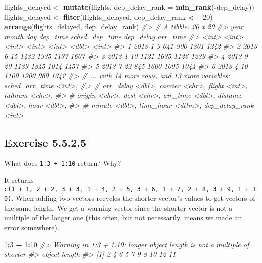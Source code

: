 \documentclass[]{book}
\newenvironment{Shaded}{\begin{snugshade}}{\end{snugshade}}
\newcommand{\CommentTok}[1]{\textcolor[rgb]{0.56,0.35,0.01}{\textit{#1}}}
\newcommand{\DataTypeTok}[1]{\textcolor[rgb]{0.13,0.29,0.53}{#1}}
\newcommand{\DecValTok}[1]{\textcolor[rgb]{0.00,0.00,0.81}{#1}}
\newcommand{\KeywordTok}[1]{\textcolor[rgb]{0.13,0.29,0.53}{\textbf{#1}}}
\newcommand{\NormalTok}[1]{#1}
\newcommand{\OperatorTok}[1]{\textcolor[rgb]{0.81,0.36,0.00}{\textbf{#1}}}
\newcommand{\StringTok}[1]{\textcolor[rgb]{0.31,0.60,0.02}{#1}}
\theoremstyle{plain}
\theoremstyle{remark}
\begin{document}
\begin{Shaded}
\begin{Highlighting}[]
\NormalTok{flights_delayed <-}\StringTok{ }\KeywordTok{mutate}\NormalTok{(flights, }\DataTypeTok{dep_delay_rank =} \KeywordTok{min_rank}\NormalTok{(}\OperatorTok{-}\NormalTok{dep_delay))}
\NormalTok{flights_delayed <-}\StringTok{ }\KeywordTok{filter}\NormalTok{(flights_delayed, dep_delay_rank }\OperatorTok{<=}\StringTok{ }\DecValTok{20}\NormalTok{)}
\KeywordTok{arrange}\NormalTok{(flights_delayed, dep_delay_rank)}
\CommentTok{#> # A tibble: 20 x 20}
\CommentTok{#>    year month   day dep_time sched_dep_time dep_delay arr_time}
\CommentTok{#>   <int> <int> <int>    <int>          <int>     <dbl>    <int>}
\CommentTok{#> 1  2013     1     9      641            900      1301     1242}
\CommentTok{#> 2  2013     6    15     1432           1935      1137     1607}
\CommentTok{#> 3  2013     1    10     1121           1635      1126     1239}
\CommentTok{#> 4  2013     9    20     1139           1845      1014     1457}
\CommentTok{#> 5  2013     7    22      845           1600      1005     1044}
\CommentTok{#> 6  2013     4    10     1100           1900       960     1342}
\CommentTok{#> # ... with 14 more rows, and 13 more variables: sched_arr_time <int>,}
\CommentTok{#> #   arr_delay <dbl>, carrier <chr>, flight <int>, tailnum <chr>,}
\CommentTok{#> #   origin <chr>, dest <chr>, air_time <dbl>, distance <dbl>, hour <dbl>,}
\CommentTok{#> #   minute <dbl>, time_hour <dttm>, dep_delay_rank <int>}
\end{Highlighting}
\end{Shaded}

\hypertarget{exercise-5.5.2.5}{%
\subsection*{\texorpdfstring{Exercise
{5.5.2.5}}{Exercise 5.5.2.5}}\label{exercise-5.5.2.5}}

What does \texttt{1:3\ +\ 1:10} return? Why?

It returns
\texttt{c(1\ +\ 1,\ 2\ +\ 2,\ 3\ +\ 3,\ 1\ +\ 4,\ 2\ +\ 5,\ 3\ +\ 6,\ 1\ +\ 7,\ 2\ +\ 8,\ 3\ +\ 9,\ 1\ +\ 10)}.
When adding two vectors recycles the shorter vector's values to get
vectors of the same length. We get a warning vector since the shorter
vector is not a multiple of the longer one (this often, but not
necessarily, means we made an error somewhere).

\begin{Shaded}
\begin{Highlighting}[]
\DecValTok{1}\OperatorTok{:}\DecValTok{3} \OperatorTok{+}\StringTok{ }\DecValTok{1}\OperatorTok{:}\DecValTok{10}
\CommentTok{#> Warning in 1:3 + 1:10: longer object length is not a multiple of shorter}
\CommentTok{#> object length}
\CommentTok{#>  [1]  2  4  6  5  7  9  8 10 12 11}
\end{Highlighting}
\end{Shaded}
\end{document}
